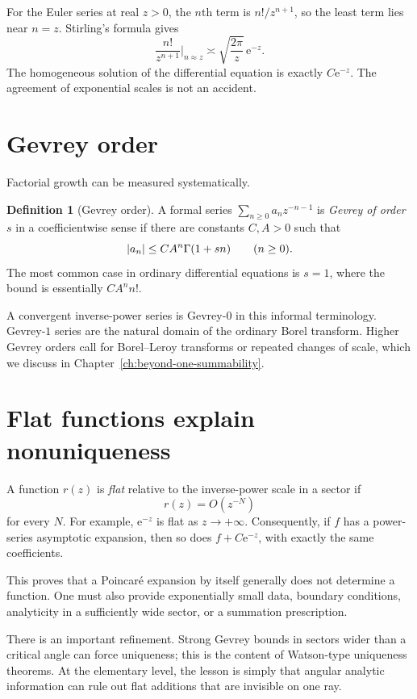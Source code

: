 \documentclass[11pt,oneside]{book}
\theoremstyle{definition}
\newtheorem{definition}[theorem]{Definition}
\theoremstyle{remark}
\newcommand{\e}{\mathrm{e}}
\newcommand{\bigO}{O}
\DeclarePairedDelimiter{\abs}{\lvert}{\rvert}
\begin{document}
For the Euler series at real $z>0$, the $n$th term is $n!/z^{n+1}$, so the least
term lies near $n=z$. Stirling's formula gives
\[
  \frac{n!}{z^{n+1}}\bigg|_{n\approx z}
  \asymp \sqrt{\frac{2\pi}{z}}\,\e^{-z}.
\]
The homogeneous solution of the differential equation is exactly $C\e^{-z}$.
The agreement of exponential scales is not an accident.

\section{Gevrey order}

Factorial growth can be measured systematically.

\begin{definition}[Gevrey order]
A formal series $\sum_{n\ge0}a_n z^{-n-1}$ is \emph{Gevrey of order $s$} in a
coefficientwise sense if there are constants $C,A>0$ such that
\begin{equation}
  \abs{a_n}\le C A^n\Gamma(1+sn)
  \qquad(n\ge0).
  \label{eq:gevrey-s-bound}
\end{equation}
The most common case in ordinary differential equations is $s=1$, where the
bound is essentially $CA^n n!$.
\end{definition}

A convergent inverse-power series is Gevrey-$0$ in this informal terminology.
Gevrey-$1$ series are the natural domain of the ordinary Borel transform. Higher
Gevrey orders call for Borel--Leroy transforms or repeated changes of scale,
which we discuss in Chapter~\ref{ch:beyond-one-summability}.

\section{Flat functions explain nonuniqueness}

A function $r(z)$ is \emph{flat} relative to the inverse-power scale in a
sector if
\[
  r(z)=\bigO(z^{-N})
\]
for every $N$. For example, $\e^{-z}$ is flat as $z\to+\infty$. Consequently,
if $f$ has a power-series asymptotic expansion, then so does
$f+C\e^{-z}$, with exactly the same coefficients.

This proves that a Poincar\'e expansion by itself generally does not determine a
function. One must also provide exponentially small data, boundary conditions,
analyticity in a sufficiently wide sector, or a summation prescription.

There is an important refinement. Strong Gevrey bounds in sectors wider than a
critical angle can force uniqueness; this is the content of Watson-type
uniqueness theorems. At the elementary level, the lesson is simply that angular
analytic information can rule out flat additions that are invisible on one ray.
\end{document}
